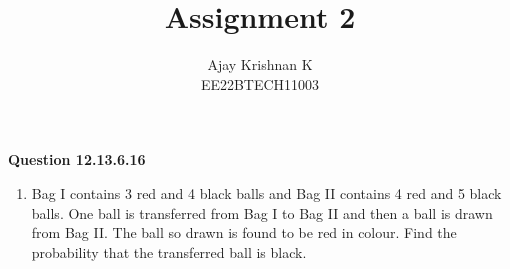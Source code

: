 \documentclass[journal,11pt]{IEEEtran}
\begin{document}
\vspace{3cm}
\author{Ajay Krishnan K\\EE22BTECH11003}

\title{Assignment 2}
\maketitle

\textbf{Question 12.13.6.16} %
\begin{enumerate}
    \item Bag I contains 3 red and 4 black balls and Bag II contains 4 red and 5 black balls.
    One ball is transferred from Bag I to Bag II and then a ball is drawn from Bag II.
    The ball so drawn is found to be red in colour. Find the probability that the
    transferred ball is black.
\end{enumerate}
\end{document}
